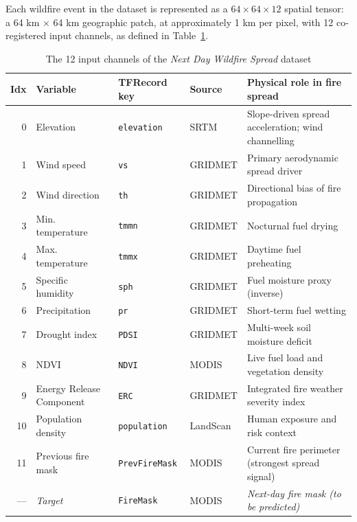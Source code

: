 Each wildfire event in the dataset is represented as a $64 \times 64 \times 12$ spatial tensor: a 64 km $\times$ 64 km geographic patch, at approximately 1 km per pixel, with 12 co-registered input channels, as defined in Table~\ref{tab:channels}.

\begin{table}[H]
    \centering
    \caption{The 12 input channels of the \textit{Next Day Wildfire Spread} dataset}
    \label{tab:channels}
    \renewcommand{\arraystretch}{1.3}
    \begin{tabular}{|r|l|l|l|p{4.2cm}|}
        \hline
        \textbf{Idx} & \textbf{Variable} & \textbf{TFRecord key} & \textbf{Source} & \textbf{Physical role in fire spread} \\
        \hline\hline
        0 & Elevation & \texttt{elevation} & SRTM & Slope-driven spread acceleration; wind channelling \\
        1 & Wind speed & \texttt{vs} & GRIDMET & Primary aerodynamic spread driver \\
        2 & Wind direction & \texttt{th} & GRIDMET & Directional bias of fire propagation \\
        3 & Min. temperature & \texttt{tmmn} & GRIDMET & Nocturnal fuel drying \\
        4 & Max. temperature & \texttt{tmmx} & GRIDMET & Daytime fuel preheating \\
        5 & Specific humidity & \texttt{sph} & GRIDMET & Fuel moisture proxy (inverse) \\
        6 & Precipitation & \texttt{pr} & GRIDMET & Short-term fuel wetting \\
        7 & Drought index & \texttt{PDSI} & GRIDMET & Multi-week soil moisture deficit \\
        8 & NDVI & \texttt{NDVI} & MODIS & Live fuel load and vegetation density \\
        9 & Energy Release Component & \texttt{ERC} & GRIDMET & Integrated fire weather severity index \\
        10 & Population density & \texttt{population} & LandScan & Human exposure and risk context \\
        11 & Previous fire mask & \texttt{PrevFireMask} & MODIS & Current fire perimeter (strongest spread signal) \\
        \hline
        — & \textit{Target} & \texttt{FireMask} & MODIS & \textit{Next-day fire mask (to be predicted)} \\
        \hline
    \end{tabular}
\end{table}

